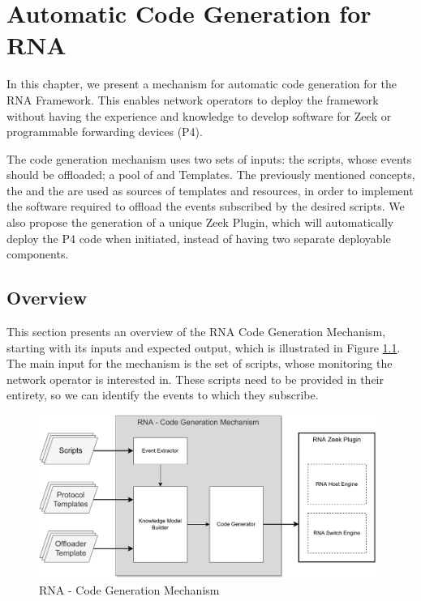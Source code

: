 \chapter{Automatic Code Generation for RNA}
\label{cap:code_gen}

In this chapter, we present a mechanism for automatic code generation for the RNA Framework. This enables network operators to deploy the framework without having the experience and knowledge to develop software for Zeek or programmable forwarding devices (P4).

The code generation mechanism uses two sets of inputs: the scripts, whose events should be offloaded; a pool of \ProtocolTemplates{} and \Offloader{} Templates. The previously mentioned concepts, the \ProtocolTemplates{} and the \Offloaders{} are used as sources of templates and resources, in order to implement the software required to offload the events subscribed by the desired scripts. We also propose the generation of a unique Zeek Plugin, which will automatically deploy the P4 code when initiated, instead of having two separate deployable components.




\section{Overview}
\label{sec:code_gen:overview}

This section presents an overview of the RNA Code Generation Mechanism, starting with its inputs and expected output, which is illustrated in Figure \ref{fig:code_gen_black_box}. The main input for the mechanism is the set of scripts, whose monitoring the network operator is interested in. These scripts need to be provided in their entirety, so we can identify the events to which they subscribe.

\begin{figure}[htb]
    \caption{RNA - Code Generation Mechanism}
    \begin{center}
        \includegraphics[width=0.98\textwidth]{images/code_gen_mechanism.pdf}
    \end{center}
    \label{fig:code_gen_black_box}
\end{figure}

